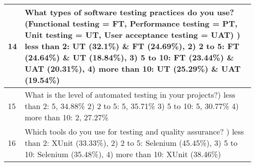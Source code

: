 \begin{table}[!ht]
\begin{tabularx}{\textwidth}{v|k}
        14 & What types of software testing practices do you use? (Functional testing = FT, Performance testing = PT, Unit testing = UT, User acceptance testing = UAT) ) less than 2: UT (32.1\%) \& FT (24.69\%),
        2) 2 to 5: FT (24.64\%) \& UT (18.84\%),
        3) 5 to 10: FT (23.44\%) \& UAT (20.31\%),
        4) more than 10: UT (25.29\%) \& UAT (19.54\%)
        \\ \hline
        
        15 & What is the level of automated testing in your projects?) less than 2: 5, 34.88\%
        2) 2 to 5: 5, 35.71\% 3) 5 to 10: 5, 30.77\% 4) more than 10: 2, 27.27\%
        \\ \hline
        
        16 & Which tools do you use for testing and quality assurance? ) less than 2: XUnit (33.33\%), 2) 2 to 5: Selenium (45.45\%), 3) 5 to 10: Selenium (35.48\%), 4) more than 10: XUnit (38.46\%)
        \\ \hline
        

\end{tabularx}
\end{table}
